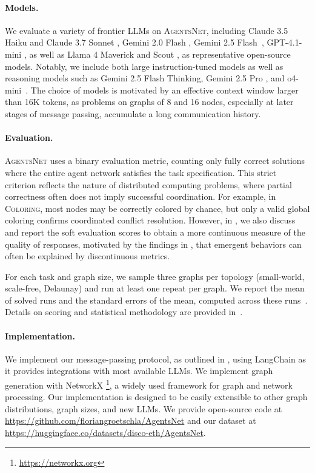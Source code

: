 \documentclass{article}
\newcommand{\benchmark}{\textsc{AgentsNet}}
\begin{document}
\paragraph{Models.}
We evaluate a variety of frontier LLMs on \benchmark{}, including Claude 3.5 Haiku and Claude 3.7 Sonnet \citep{anthropic2024claude3}, 
Gemini 2.0 Flash \citep{google2024gemini2.0}, 
Gemini 2.5 Flash~\citep{google2024gemini2.5flash}, GPT-4.1-mini \citep{openai2025gpt4.1}, as well as Llama 4 Maverick and Scout \citep{meta2025llama4}, as representative open-source models. Notably, we include both large instruction-tuned models as well as reasoning models such as Gemini 2.5 Flash Thinking, Gemini 2.5 Pro \citep{google2024gemini2.5pro}, and o4-mini~\citep{openai2025o4}. The choice of models is motivated by an effective context window larger than 16K tokens, as problems on graphs of 8 and 16 nodes, especially at later stages of message passing, accumulate a long communication history.

\paragraph{Evaluation.}
\benchmark{} uses a binary evaluation metric, counting only fully correct solutions where the entire agent network satisfies the task specification. This strict criterion reflects the nature of distributed computing problems, where partial correctness often does not imply successful coordination. For example, in \textsc{Coloring}, most nodes may be correctly colored by chance, but only a valid global coloring confirms coordinated conflict resolution. However, in , we also discuss and report the soft evaluation scores to obtain a more continuous measure of the quality of responses, motivated by the findings in \citet{schaeffer2023emergent}, that emergent behaviors can often be explained by discontinuous metrics.

For each task and graph size, we sample three graphs per topology (small-world, scale-free, Delaunay) and run at least one repeat per graph. We report the mean of solved runs and the standard errors of the mean, computed across these runs~\cite{miller2024adding}. Details on scoring and statistical methodology are provided in~.

\paragraph{Implementation.}
We implement our message-passing protocol, as outlined in , using LangChain  \citep{Chase_LangChain_2022} as it provides integrations with most available LLMs. 
We implement graph generation with NetworkX \footnote{\url{https://networkx.org}}, a widely used framework for graph and network processing. Our implementation is designed to be easily extensible to other graph distributions, graph sizes, and new LLMs.
We provide open-source code at \url{https://github.com/floriangroetschla/AgentsNet} and our dataset at \url{https://huggingface.co/datasets/disco-eth/AgentsNet}.
\end{document}
